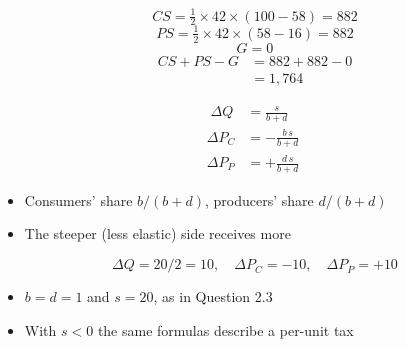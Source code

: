 \documentclass{beamer}
\begin{document}
\begin{frame}[plain,label=w3_wt5_ledger]
  \Large
  \[
    \tag{29}\;CS = \tfrac{1}{2} \times 42 \times (100 - 58) = 882
  \]
  \[
    \tag{30}\;PS = \tfrac{1}{2} \times 42 \times (58 - 16) = 882
  \]
  \[
    \tag{31}\;G = 0
  \]
  \begin{align*}
    \tag{32}\;CS + PS - G &= 882 + 882 - 0\\
                 &= 1{,}764
  \end{align*}
\end{frame}

\begin{frame}[plain,label=w3_appA_incidence]
  \Large
  \begin{align*}
    \tag{33}\;\Delta Q &= \frac{s}{b + d}\\
    \Delta P_C &= -\frac{b\,s}{b + d}\\
    \Delta P_P &= +\frac{d\,s}{b + d}
  \end{align*}
  \vspace{0.3em}
  \begin{itemize}\Large
    \item Consumers' share $b/(b + d)$, producers' share $d/(b + d)$
    \item The steeper (less elastic) side receives more
  \end{itemize}
\end{frame}

\begin{frame}[plain,label=w3_appA_example]
  \Large
  \[
    \tag{34}\;\Delta Q = 20/2 = 10, \quad \Delta P_C = -10, \quad \Delta P_P = +10
  \]
  \vspace{0.3em}
  \begin{itemize}\Large
    \item $b = d = 1$ and $s = 20$, as in Question 2.3
    \item With $s < 0$ the same formulas describe a per-unit tax
  \end{itemize}
\end{frame}
\end{document}
